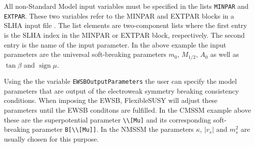 \documentclass[final,3p,11pt,pdflatex]{elsarticle}
\makeatletter
\newcommand{\fs}{FlexibleSUSY\@\xspace}
\newcommand{\code}[1]{\lstinline|#1|}  %
\DeclareMathOperator{\sign}{sign}
\makeatother
\begin{document}
All non-Standard Model input variables must be specified in the lists
\code{MINPAR} and \code{EXTPAR}.  These two variables refer to the
MINPAR and EXTPAR blocks in a SLHA input file \cite{Skands:2003cj}.
The list elements are two-component lists where the first entry is the
SLHA index in the MINPAR or EXTPAR block, respectively.  The second
entry is the name of the input parameter.  In the above example the
input parameters are the universal soft-breaking parameters $m_0$,
$M_{1/2}$, $A_0$ as well as $\tan\beta$ and $\sign\mu$.

Using the the variable \code{EWSBOutputParameters} the user can
specify the model parameters that are output of the electroweak
symmetry breaking consistency conditions.  When imposing the EWSB, \fs
will adjust these parameters until the EWSB conditons are fulfilled.
In the CMSSM example above these are the superpotential parameter
\code{\\[Mu]} and its corresponding soft-breaking parameter
\code{B[\\[Mu]]}.  In the NMSSM the parameters $\kappa$, $|v_s|$ and
$m_s^2$ are usually chosen for this purpose.
\end{document}
